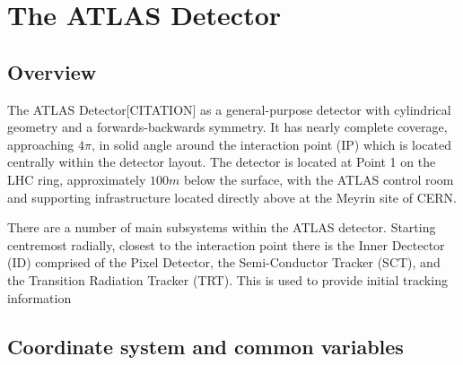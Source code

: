 \section{The ATLAS Detector}
\subsection{Overview}
The ATLAS Detector[CITATION] as a general-purpose detector with cylindrical geometry and a forwards-backwards symmetry. It has nearly complete coverage, approaching $4\pi$, in solid angle around the interaction point (IP) which is located centrally within the detector layout. The detector is located at Point 1 on the LHC ring, approximately $100m$ below the surface, with the ATLAS control room and supporting infrastructure located directly above at the Meyrin site of CERN.

There are a number of main subsystems within the ATLAS detector. Starting centremost radially, closest to the interaction point there is the Inner Dectector (ID) comprised of the Pixel Detector, the Semi-Conductor Tracker (SCT), and the Transition Radiation Tracker (TRT). This is used to provide initial tracking information 


\subsection{Coordinate system and common variables}

